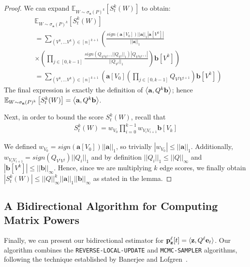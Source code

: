\begin{proof}
We can expand $\mathbb{E}_{W \sim \sigma_{\mathbf{a}}(P)^k} \left[S_{t}^k(W)\right]$ to obtain:
\small
\begin{align*}
&\mathbb{E}_{W \sim \sigma_{\mathbf{a}}(P)^k} \left[S_{t}^k(W)\right] \\ 
&= \sum_{(V^0, ... V^{k}) \in [n]^{k+1}} \left(\frac{sign(\mathbf{a}[V_0])||\mathbf{a}||_1|\mathbf{a}[V^0]|}{||\mathbf{a}||_1} \right. \\
&\left. \times \left( \prod_{j \in [0, k-1]} \frac{sign(Q_{V^jV^{j+1}}||Q_{V^j}||_1)|Q_{V^jV^{j+1}}|}{||Q_{V^j}||_1} \right) \mathbf{b}[V^k] \right) \\
& = \sum_{(V^0, ... V^{k}) \in [n]^{k+1}} \left(\mathbf{a}[V_0] \left( \prod_{j \in [0, k-1]} Q_{V^jV^{j+1}}\right) \mathbf{b}[V^k] \right)
\end{align*}
\normalsize
The final expression is exactly the definition of $\left< \mathbf{a}, Q^k\mathbf{b} \right>$; hence $\mathbb{E}_{W \sim \sigma_{\mathbf{a}}(P)^k} \left[S_{t}^k(W)\right] = \left< \mathbf{a}, Q^k\mathbf{b} \right>$.


Next, in order to bound the score $S_{t}^k(W)$, recall that
\begin{align*}
S_{t}^k(W) = w_{V_0}\prod_{i=0}^{k-1}w_{V_iV_{i+1}}\mathbf{b}[V_{k}]
\end{align*}

We defined $w_{V_0} = sign(\mathbf{a}[V_0])||\mathbf{a}||_1$, so trivially $|w_{V_0}| \leq ||\mathbf{a}||_1$.
Additionally, $w_{V_iV_{i+1}} = sign(Q_{V^iV^j})||Q_i||_1 $ and by definition $||Q_i||_1  \leq ||Q||_{\infty}$ and $| \mathbf{b}[V^k] |\leq ||\mathbf{b}||_\infty$.
Hence, since we are multiplying $k$ edge scores, we finally obtain
$|S_{t}^k(W)| \leq ||Q||_{\infty}^k||\mathbf{a}||_1||\mathbf{b}||_\infty$ as stated in the lemma.
\end{proof}

\subsection{A Bidirectional Algorithm for Computing Matrix Powers}
\label{ssec:bidiralgo}

Finally, we can present our bidirectional estimator for ${\mathbf{p}}_\mathbf{z}^{\ell}[t] = \langle\mathbf{z},Q^{\ell}\mathbf{e}_t\rangle$. 
Our algorithm combines the \texttt{REVERSE-LOCAL-UPDATE} and \texttt{MCMC-SAMPLER} algorithms, following the technique established by Banerjee and Lofgren~\cite{banerjee2015fast}. 

